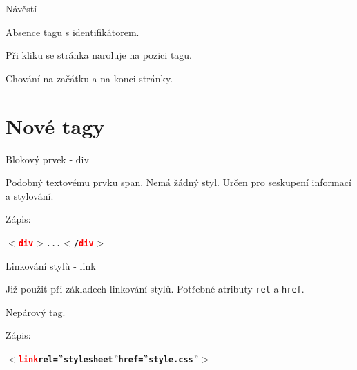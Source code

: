 \documentclass[aspectratio=1610]{beamer}
\begin{document}
\begin{frame}{Návěstí}
    \begin{cardTiny}
        \begin{flushleft}
            Absence tagu s identifikátorem.
            
            \vspace{2ex}

            Při kliku se stránka naroluje na pozici tagu.

            \vspace{2ex}

            Chování na začátku a na konci stránky.
        \end{flushleft}
    \end{cardTiny}
\end{frame}


\section{Nové tagy}

\begin{frame}{Blokový prvek - div}
    \begin{cardTiny}
        \begin{flushleft}
            Podobný textovému prvku span. Nemá žádný styl. Určen pro seskupení informací a stylování.
            
            \vspace{2ex}

            Zápis: \begin{alltt}\textbf{$<$\textcolor{red}{div}$>$}...\textbf{$<$/\textcolor{red}{div}$>$}\end{alltt}
        \end{flushleft}
    \end{cardTiny}
\end{frame}

\begin{frame}{Linkování stylů - link}
    \begin{cardTiny}
        \begin{flushleft}
            Již použit při základech linkování stylů. Potřebné atributy \texttt{rel} a \texttt{href}.
            
            Nepárový tag.

            \vspace{2ex}

            Zápis: \begin{alltt}\textbf{$<$\textcolor{red}{link} rel=$"$stylesheet$"$ href=$"$style.css$"$$>$}\end{alltt}
        \end{flushleft}
    \end{cardTiny}
\end{frame}
\end{document}
